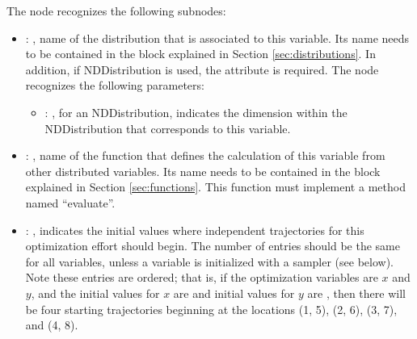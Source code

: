 \begin{itemize}
      The  node recognizes the following subnodes:
      \begin{itemize}
        \item {}: ,
          name of the distribution that is associated to this variable.               Its name needs
          to be contained in the  block explained               in Section
          \ref{sec:distributions}. In addition, if NDDistribution is used,               the
          attribute  is required. 
          The  node recognizes the following parameters:
            \begin{itemize}
              \item {}: ,
                for an NDDistribution, indicates the dimension within the NDDistribution that
                corresponds               to this variable.
          \end{itemize}

        \item {}: ,
          name of the function that               defines the calculation of this variable from
          other distributed variables.  Its name               needs to be contained in the
           block explained in Section               \ref{sec:functions}. This
          function must implement a method named ``evaluate''.               

        \item {}: ,
          indicates the initial values where independent trajectories for this optimization
          effort should begin. The number of entries should be the same for all variables, unless
          a variable is initialized with a sampler (see  below). Note these
          entries are ordered; that is, if the optimization variables are $x$ and $y$, and the
          initial               values for $x$ are  and initial values for $y$
          are ,               then there will be four starting trajectories
          beginning at the locations (1, 5), (2, 6),               (3, 7), and (4, 8).
      \end{itemize}


\end{itemize}

